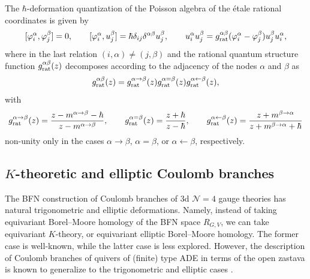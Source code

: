 \begin{prop}
    The $\hbar$-deformation quantization of the Poisson algebra of the étale rational coordinates is given by
    \begin{equation}\label{eq:QuantCBRel}
    \begin{aligned}
    [\varphi_i^\alpha,\varphi_j^\beta] = 0, \qquad
    [\varphi_i^\alpha,u_j^{\beta}] = {\hbar\delta_{ij}\delta^{\alpha\beta}}u_j^{\beta}, \qquad
    u_i^{\alpha} u_j^{\beta} = g_\textup{rat}^{\alpha\beta}(\varphi_i^\alpha-\varphi_j^\beta) u_j^{\beta} u_i^{\alpha},
    \end{aligned}
    \end{equation}
    where in the last relation $(i,\alpha) \neq (j,\beta)$ and the rational quantum structure function $g_\textup{rat}^{\alpha\beta}(z)$ decomposes according to the adjacency of the nodes $\alpha$ and $\beta$ as
	\begin{equation}
		g_\textup{rat}^{\alpha\beta}(z) = g_\textup{rat}^{\alpha \to \beta}(z) g_\textup{rat}^{\alpha = \beta}(z) g_\textup{rat}^{\alpha \leftarrow \beta}(z),
	\end{equation}
	with
	\begin{align}
		g_\textup{rat}^{\alpha \to \beta}(z) = \frac{z-m^{\alpha\to\beta}-\hbar}{z-m^{\alpha\to\beta}}, \qquad
		g_\textup{rat}^{\alpha = \beta}(z) = \frac{z+\hbar}{z-\hbar}, \qquad
		g_\textup{rat}^{\alpha \leftarrow \beta}(z) = \frac{z+m^{\beta\to\alpha}}{z+m^{\beta\to\alpha}+\hbar}
	\end{align}
    non-unity only in the cases $\alpha \to \beta$, $\alpha = \beta$, or $\alpha \leftarrow \beta$, respectively.
\end{prop}

\subsection{$K$-theoretic and elliptic Coulomb branches}

The BFN construction of Coulomb branches of 3d $\mathcal{N}=4$ gauge theories has natural trigonometric and elliptic deformations. Namely, instead of taking equivariant Borel--Moore homology of the BFN space $R_{G,V}$, we can take equivariant $K$-theory, or equivariant elliptic Borel--Moore homology. The former case is well-known, while the latter case is less explored. However, the description of Coulomb branches of quivers of (finite) type ADE in terms of the open zastava is known to generalize to the trigonometric and elliptic cases \cite{finkelberg_towards_2018,finkelberg_elliptic_2022}.

